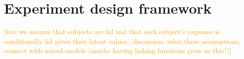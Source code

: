\documentclass{article}
\newcommand{\lou}[1]{\textcolor{orange}{[lou: #1]}}
\begin{document}


\section{Experiment design framework}
\label{s:bayes}

\lou{we assume that subjects are iid and that each subject's response is conditionally iid given their latent values.. discussion: relax these assumptions, connect with mixed models (maybe having linking functions gives us this?)}
\end{document}
